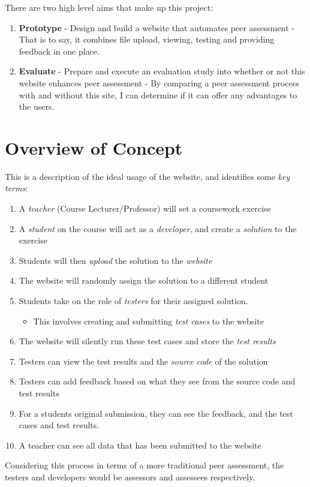 \documentclass[a4paper,11pt]{report}
\begin{document}
There are two high level aims that make up this project:
\begin{enumerate}
\item \textbf{Prototype} - Design and build a website that automates peer assessment - That is to say, it combines file upload, viewing, testing and providing feedback in one place.
\item \textbf{Evaluate} - Prepare and execute an evaluation study into whether or not this website enhances peer assessment - By comparing a peer assessment process with and without this site, I can determine if it can offer any advantages to the users.
\end{enumerate}

\newpage
\section{Overview of Concept}
This is a description of the ideal usage of the website, and identifies some \textit{key terms}:
\begin{enumerate}
 \item A \textit{teacher} (Course Lecturer/Professor) will set a coursework exercise
 \item A \textit{student} on the course will act as a \textit{developer}, and create a \textit{solution} to the exercise
 \item Students will then \textit{upload} the solution to the \textit{website}
 \item The website will randomly assign the solution to a different student
 \item Students take on the role of \textit{testers} for their assigned solution.
    \begin{itemize}
    \item This involves creating and submitting \textit{test cases} to the website
    \end{itemize}
 \item The website will silently run these test cases and store the \textit{test results}
 \item Testers can view the test results and the \textit{source code} of the solution
 \item Testers can add feedback based on what they see from the source code and test results
 \item For a students original submission, they can see the feedback, and the test cases and test results.
 \item A teacher can see all data that has been submitted to the website 
\end{enumerate}
Considering this process in terms of a more traditional peer assessment, the testers and developers would be assessors and assessees respectively.
\end{document}
